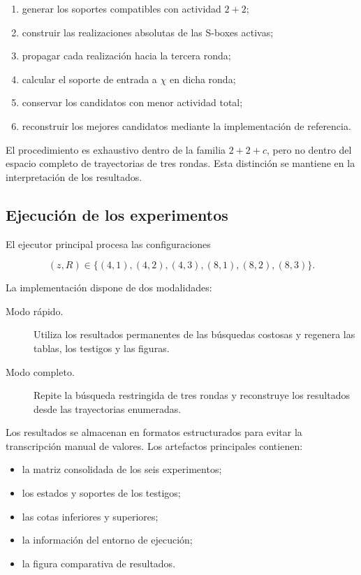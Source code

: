 \begin{enumerate}
    \item generar los soportes compatibles con actividad $2+2$;

    \item construir las realizaciones absolutas de las S-boxes activas;

    \item propagar cada realización hacia la tercera ronda;

    \item calcular el soporte de entrada a $\chi$ en dicha ronda;

    \item conservar los candidatos con menor actividad total;

    \item reconstruir los mejores candidatos mediante la implementación
    de referencia.
\end{enumerate}

El procedimiento es exhaustivo dentro de la familia $2+2+c$, pero no
dentro del espacio completo de trayectorias de tres rondas. Esta
distinción se mantiene en la interpretación de los resultados.


\subsection{Ejecución de los experimentos}
\label{subsec:ejecucion_experimentos}

El ejecutor principal procesa las configuraciones

\[
(z,R)
\in
\{
(4,1),
(4,2),
(4,3),
(8,1),
(8,2),
(8,3)
\}.
\]

La implementación dispone de dos modalidades:

\begin{description}
    \item[Modo rápido.] Utiliza los resultados permanentes de las
    búsquedas costosas y regenera las tablas, los testigos y las figuras.

    \item[Modo completo.] Repite la búsqueda restringida de tres rondas
    y reconstruye los resultados desde las trayectorias enumeradas.
\end{description}

Los resultados se almacenan en formatos estructurados para evitar la
transcripción manual de valores. Los artefactos principales contienen:

\begin{itemize}
    \item la matriz consolidada de los seis experimentos;
    \item los estados y soportes de los testigos;
    \item las cotas inferiores y superiores;
    \item la información del entorno de ejecución;
    \item la figura comparativa de resultados.
\end{itemize}

